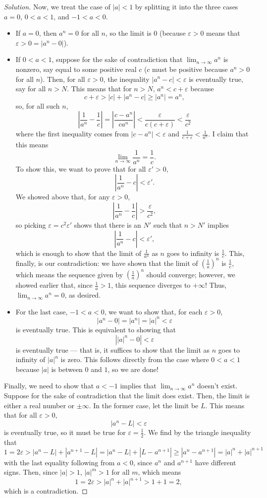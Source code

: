 \documentclass[11pt]{scrartcl}
\providecommand{\eps}{\varepsilon}
\providecommand{\ii}{\item}
\theoremstyle{remark}
\newenvironment{soln}{\begin{proof}[Solution]}{\end{proof}}
\providecommand{\abs}[1]{\left|#1\right|}
\begin{document}
\begin{soln}
		Now, we treat the case of $|a| < 1$ by splitting it into the three cases
		$a = 0$, $0 < a < 1$, and $-1 < a < 0$.
		\begin{itemize}
			\ii If $a = 0$, then $a^n = 0$ for all $n$, so the limit is $0$
			(because $\eps > 0$ means that $\eps > 0 = \abs{a^n - 0}$).
			\ii If $0 < a < 1$, suppose for the sake of contradiction
			that $\lim_{n\to\infty} a^n$ is nonzero, say equal to some
			positive real $c$ ($c$ must be positive because $a^n > 0$ for all $n$).
			Then, for all $\eps > 0$, the inequality $|a^n - c| < \eps$
			is eventually true, say for all $n > N$. This means that for $n > N$,
			$a^n < c + \eps$ because
			\[c + \eps > |c| + |a^n - c| \ge |a^n| = a^n,\]
			so, for all such $n$,
			\[\abs{\frac{1}{a^n} - \frac{1}{c}} =
			\abs{\frac{c - a^n}{ca^n}} < \frac{\eps}{c(c + \eps)}
			< \frac{\eps}{c^2}\]
			where the first inequality comes from $|c - a^n| < \eps$
			and $\frac{1}{c + \eps} < \frac{1}{a^n}$.
			I claim that this means
			\[\lim_{n\to\infty} \frac{1}{a^n} = \frac{1}{c}.\]
			To show this, we want to prove that for all $\eps' > 0$,
			\[\abs{\frac{1}{a^n} - c} < \eps'.\]
			We showed above that, for any $\eps > 0$,
			\[\abs{\frac{1}{a^n} - \frac1c} > \frac{\eps}{c^2},\]
			so picking $\eps = c^2\eps'$ shows that there is an $N'$
			such that $n > N'$ implies
			\[\abs{\frac{1}{a^n} - c} < \eps',\]
			which is enough to show that the limit of $\frac{1}{a^n}$
			as $n$ goes to infinity is $\frac1c$.
			This, finally, is our contradiction:
			we have shown that the limit of $(\frac1a)^n$ is $\frac1c$,
			which means the sequence given by $(\frac1a)^n$ should converge;
			however, we showed earlier that, since $\frac1a > 1$,
			this sequence diverges to $+\infty$! Thus, $\lim_{n\to\infty} a^n = 0$,
			as desired.
			\ii For the last case, $-1 < a < 0$, we want to show that,
			for each $\eps > 0$,
			\[\abs{a^n - 0} = \abs{a^n} = |a|^n < \eps\]
			is eventually true.
			This is equivalent to showing that
			\[\abs{|a|^n - 0} < \eps\]
			is eventually true --- that is, it suffices to show that
			the limit as $n$ goes to infinity of $|a|^n$ is zero.
			This follows directly from the case where $0 < a < 1$
			because $|a|$ is between $0$ and $1$, so we are done!
		\end{itemize}
		
		Finally, we need to show that $a < -1$ implies that
		$\lim_{n\to\infty} a^n$ doesn't exist. Suppose for the sake of contradiction
		that the limit does exist. Then, the limit is either a real number
		or $\pm\infty$.
		In the former case, let the limit be $L$.
		This means that for all $\eps > 0$,
		\[|a^n - L| < \eps\]
		is eventually true, so it must be true for $\eps = \frac12$.
		We find by the triangle inequality that
		\[1 = 2\eps > |a^n - L| + |a^{n+1} - L| = |a^n - L| + |L - a^{n+1}| \ge
		|a^n - a^{n+1}| = |a|^n + |a|^{n+1}\]
		with the last equality following from $a < 0$, since $a^n$
		and $a^{n+1}$ have different signs.
		Then, since $|a| > 1$, $|a|^m > 1$ for all $m$, which means
		\[1 = 2\eps > |a|^n + |a|^{n+1} > 1 + 1 = 2,\]
		which is a contradiction.
		

\end{soln}
\end{document}
